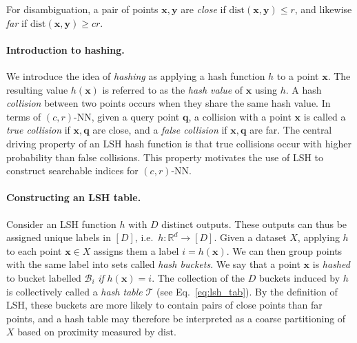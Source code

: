 \documentclass{article}
\newcommand{\Rd}{\mathbb{R}^d}
\newcommand{\bx}{\mathbf{x}}
\newcommand{\by}{\mathbf{y}}
\newcommand{\bq}{\mathbf{q}}
\newcommand{\dist}{\mathrm{dist}}
\newcommand{\mB}{\mathcal{B}}
\newcommand{\mT}{\mathcal{T}}
\newcommand{\crNN}{$(c, r)$-NN\xspace}
\begin{document}
For disambiguation, a pair of points $\bx, \by$ are \emph{close} if $\dist(\bx, \by) \leq r$, and likewise \emph{far} if $\dist(\bx, \by) \geq cr$.






\paragraph{Introduction to hashing.}

We introduce the idea of \emph{hashing} as applying a hash function $h$ to a point $\bx$. The resulting value $h(\bx)$ is referred to as the \emph{hash value} of $\bx$ using $h$. A hash \emph{collision} between two points occurs when they share the same hash value. In terms of \crNN, given a query point $\bq$, a collision with a point $\bx$ is called a \emph{true collision} if $\bx, \bq$ are close, and a \emph{false collision} if $\bx, \bq$ are far. 
The central driving property of an LSH hash function is that true collisions occur with higher probability than false collisions. This property motivates the use of LSH to construct searchable indices for \crNN.

\paragraph{Constructing an LSH table.}

Consider an LSH function $h$ with $D$ distinct outputs. These outputs can thus be assigned unique labels in $[D]$, i.e.\ $h : \Rd \rightarrow [D]$. Given a dataset $X$, applying $h$ to each point $\bx \in X$ assigns them a label $i = h(\bx)$. We can then group points with the same label into sets called \emph{hash buckets}. We say that a point $\bx$ is \emph{hashed} to bucket labelled $\mB_i$ \textit{if} $h(\bx) = i$. The collection of the $D$ buckets induced by $h$ is collectively called a \emph{hash table} $\mT$ (see Eq.~\ref{eq:lsh_tab}). By the definition of LSH, these buckets are more likely to contain pairs of close points than far points, and a hash table may therefore be interpreted as a coarse partitioning of $X$ based on proximity measured by $\dist$.
\end{document}
